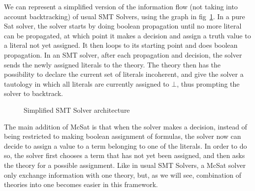 We can represent a simplified version of the information flow (not taking into
account backtracking) of usual SMT Solvers, using the graph in fig~\ref{fig:smt_flow}.
In a pure Sat solver, the solver starts by doing
boolean propagation until no more literal can be propagated, at which point it
makes a decision and assign a truth value to a literal not yet assigned. It then
loops to its starting point and does boolean propagation. In an SMT solver,
after each propagation and decision, the solver sends the newly assigned literals
to the theory. The theory then has the possibility to declare the current set of
literals incoherent, and give the solver a tautology in which all literals are currently
assigned to $\bot$, thus prompting the solver to backtrack.

\begin{figure}
  \begin{center}
  \end{center}
  \caption{Simplified SMT Solver architecture}\label{fig:smt_flow}
\end{figure}

The main addition of McSat is that when the solver makes a decision, instead of
being restricted to making boolean assignment of formulas, the solver now can
decide to assign a value to a term belonging to one of the literals. In order to do so,
the solver first chooses a term that has not yet been assigned, and then asks
the theory for a possible assignment. Like in usual SMT Solvers, a McSat solver
only exchange information with one theory, but, as we will see, combination
of theories into one becomes easier in this framework.

